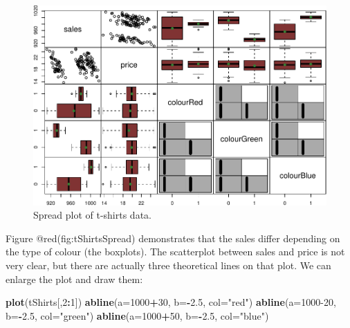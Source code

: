 \documentclass[
]{book}
\newenvironment{Shaded}{\begin{snugshade}}{\end{snugshade}}
\newcommand{\DataTypeTok}[1]{\textcolor[rgb]{0.13,0.29,0.53}{#1}}
\newcommand{\DecValTok}[1]{\textcolor[rgb]{0.00,0.00,0.81}{#1}}
\newcommand{\FloatTok}[1]{\textcolor[rgb]{0.00,0.00,0.81}{#1}}
\newcommand{\KeywordTok}[1]{\textcolor[rgb]{0.13,0.29,0.53}{\textbf{#1}}}
\newcommand{\NormalTok}[1]{#1}
\newcommand{\OperatorTok}[1]{\textcolor[rgb]{0.81,0.36,0.00}{\textbf{#1}}}
\newcommand{\StringTok}[1]{\textcolor[rgb]{0.31,0.60,0.02}{#1}}
\theoremstyle{definition}
\theoremstyle{definition}
\theoremstyle{definition}
\theoremstyle{definition}
\theoremstyle{remark}
\begin{document}
\begin{figure}
\centering
\includegraphics{Svetunkov---Statistics-for-Business-Analytics_files/figure-latex/tShirtsSpread-1.pdf}
\caption{\label{fig:tShirtsSpread}Spread plot of t-shirts data.}
\end{figure}

Figure @red(fig:tShirtsSpread) demonstrates that the sales differ depending on the type of colour (the boxplots). The scatterplot between sales and price is not very clear, but there are actually three theoretical lines on that plot. We can enlarge the plot and draw them:

\begin{Shaded}
\begin{Highlighting}[]
\KeywordTok{plot}\NormalTok{(tShirts[,}\DecValTok{2}\OperatorTok{:}\DecValTok{1}\NormalTok{])}
\KeywordTok{abline}\NormalTok{(}\DataTypeTok{a=}\DecValTok{1000}\OperatorTok{+}\DecValTok{30}\NormalTok{, }\DataTypeTok{b=}\OperatorTok{{-}}\FloatTok{2.5}\NormalTok{, }\DataTypeTok{col=}\StringTok{"red"}\NormalTok{)}
\KeywordTok{abline}\NormalTok{(}\DataTypeTok{a=}\DecValTok{1000{-}20}\NormalTok{, }\DataTypeTok{b=}\OperatorTok{{-}}\FloatTok{2.5}\NormalTok{, }\DataTypeTok{col=}\StringTok{"green"}\NormalTok{)}
\KeywordTok{abline}\NormalTok{(}\DataTypeTok{a=}\DecValTok{1000}\OperatorTok{+}\DecValTok{50}\NormalTok{, }\DataTypeTok{b=}\OperatorTok{{-}}\FloatTok{2.5}\NormalTok{, }\DataTypeTok{col=}\StringTok{"blue"}\NormalTok{)}
\end{Highlighting}
\end{Shaded}
\end{document}
